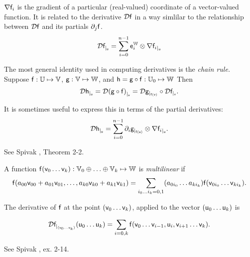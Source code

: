 ${\mathbf \nabla}{\mathsf{f}_i}$ is the gradient of a particular (real-valued) coordinate
of a vector-valued function. It is related to the derivative ${\mathcal{D}{\mathsf{f}}}$
in a way simlilar to the relationship between ${\mathcal{D}{\mathsf{f}}}$ and its partials ${\partial}_{j}{\mathsf{f}}$.
\begin{equation}
{\mathcal{D}{\mathsf{f}}_{\mid_{\mathsf{u}}}} = \sum_{i=0}^{n-1}  \mathsf{e}_i^{\mathbb{W}} \otimes {\mathbf \nabla}{\mathsf{f}_i}_{\mid_{\mathsf{u}}}
\end{equation}

The most general identity used in computing derivatives is the \textit{chain rule.}
Suppose
$\mathsf{f}:\mathbb{U} \mapsto \mathbb{V}$,
$\mathsf{g}:\mathbb{V} \mapsto \mathbb{W}$,
and
$\mathsf{h} = \mathsf{g} \circ \mathsf{f} : \mathbb{U}_0 \mapsto \mathbb{W}$
Then
\begin{equation}
\label{eq:chain_rule}
{\mathcal{D}{\mathsf{h}}_{\mid_{\mathsf{u}}}}
=  {\mathcal{D}{(\mathsf{g} \circ \mathsf{f})}_{\mid_{\mathsf{v}}}}
=  {\mathcal{D}{\mathsf{g}}_{\mid_{\mathsf{f}(\mathsf{v})}}}  \circ  {\mathcal{D}{\mathsf{f}}_{\mid_{\mathsf{v}}}}.
\end{equation}

It is sometimes useful to express this in terms of the partial derivatives:
\begin{equation}
\label{eq:chain_rule_partials}
{\mathcal{D}{\mathsf{h}}_{\mid_{\mathsf{u}}}} =  \sum_{i=0}^{n-1} {\partial}_{i}{\mathsf{g}}_{\mid_{\mathsf{f}(\mathsf{u})}} \otimes  {\mathbf \nabla}{\mathsf{f}_i}_{\mid_{\mathsf{u}}}.
\end{equation}

See Spivak \cite{spivak-1965}, Theorem 2-2.


\label{sec:Multilinear-functions}

A function
 $\mathsf{f}(\mathsf{v}_0 \ldots \mathsf{v}_k):\mathbb{V}_0 \oplus \ldots \oplus \mathbb{V}_k \mapsto \mathbb{W}$
is \textit{multilinear} if
\begin{equation}
\mathsf{f}(a_{00} \mathsf{v}_{00} + a_{01} \mathsf{v}_{01}, \ldots, a_{k0} \mathsf{v}_{k0} + a_{k1} \mathsf{v}_{k1})
 =  \sum_{i_0 \ldots i_k = 0,1} (a_{0i_0} \ldots a_{ki_k}) \mathsf{f}(\mathsf{v}_{0i_0} \ldots \mathsf{v}_{ki_k}).
\end{equation}

The derivative of $\mathsf{f}$
at the point $(\mathsf{v}_0 \ldots \mathsf{v}_k)$, applied to the vector $(\mathsf{u}_0 \ldots \mathsf{u}_k)$ is

\begin{equation}
{\mathcal{D}{\mathsf{f}}_{\mid_{(\mathsf{v}_0 \ldots \mathsf{v}_k)}}({\mathsf{u}_0 \ldots \mathsf{u}_k})}
 =  \sum_{i=0,k} \mathsf{f}(\mathsf{v}_0 \ldots \mathsf{v}_{i-1},\mathsf{u}_i,\mathsf{v}_{i+1} \ldots \mathsf{v}_k).
\end{equation}

See Spivak \cite{spivak-1965}, ex. 2-14.

